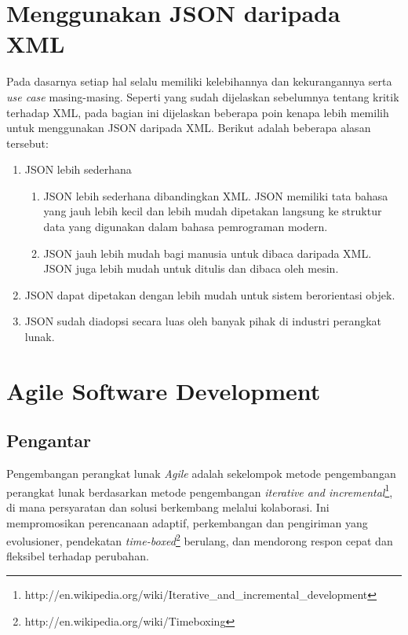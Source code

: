 \documentclass[a4paper, 12pt]{report}
\begin{document}
\section{Menggunakan JSON daripada XML}

\onehalfspacing Pada dasarnya setiap hal selalu memiliki kelebihannya dan kekurangannya serta \textit{use case} masing-masing. Seperti yang sudah dijelaskan sebelumnya tentang kritik terhadap XML, pada bagian ini dijelaskan beberapa poin kenapa lebih memilih untuk menggunakan JSON daripada XML. Berikut adalah beberapa alasan tersebut:

\begin{enumerate}
  \item JSON lebih sederhana
  \begin{enumerate}
    \item JSON lebih sederhana dibandingkan XML. JSON memiliki tata bahasa yang jauh lebih kecil dan lebih mudah dipetakan langsung ke struktur data yang digunakan dalam bahasa pemrograman modern.
    \item JSON jauh lebih mudah bagi manusia untuk dibaca daripada XML. JSON juga lebih mudah untuk ditulis dan dibaca oleh mesin.
  \end{enumerate}
  \item JSON dapat dipetakan dengan lebih mudah untuk sistem berorientasi objek.
  \item JSON sudah diadopsi secara luas oleh banyak pihak di industri perangkat lunak\cite{json-continue-to-winning}\cite{json-continue-to-push}.
\end{enumerate}

\section{Agile Software Development}
\subsection{Pengantar}
\onehalfspacing Pengembangan perangkat lunak \textit{Agile} adalah sekelompok metode pengembangan perangkat lunak berdasarkan metode pengembangan \textit{iterative and incremental}\footnote{http://en.wikipedia.org/wiki/Iterative\_and\_incremental\_development}, di mana persyaratan dan solusi berkembang melalui kolaborasi. Ini mempromosikan perencanaan adaptif, perkembangan dan pengiriman yang evolusioner, pendekatan \textit{time-boxed}\footnote{http://en.wikipedia.org/wiki/Timeboxing} berulang, dan mendorong respon cepat dan fleksibel terhadap perubahan\cite{agile-wikipedia}.
\end{document}
